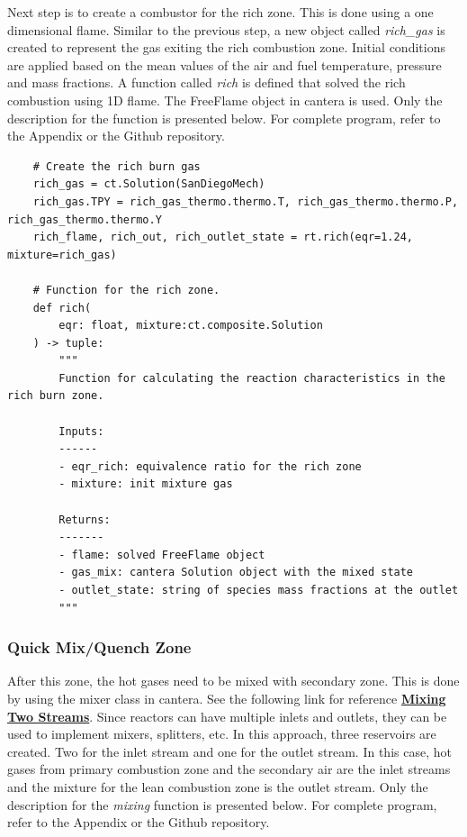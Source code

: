 Next step is to create a combustor for the rich zone. This is done using a one dimensional flame. Similar to the previous step, a new object called \textit{rich\_gas} is created to represent the gas exiting the rich combustion zone. Initial conditions are applied based on the mean values of the air and fuel temperature, pressure and mass fractions. A function called \textit{rich} is defined that solved the rich combustion using 1D flame. The FreeFlame object in cantera is used. Only the description for the function is presented below. For complete program, refer to the Appendix or the Github repository.

\begin{verbatim}
    # Create the rich burn gas
    rich_gas = ct.Solution(SanDiegoMech)    
    rich_gas.TPY = rich_gas_thermo.thermo.T, rich_gas_thermo.thermo.P, rich_gas_thermo.thermo.Y
    rich_flame, rich_out, rich_outlet_state = rt.rich(eqr=1.24, mixture=rich_gas)

    # Function for the rich zone.
    def rich(
        eqr: float, mixture:ct.composite.Solution
    ) -> tuple:
        """
        Function for calculating the reaction characteristics in the rich burn zone.
       
        Inputs:
        ------
        - eqr_rich: equivalence ratio for the rich zone
        - mixture: init mixture gas
       
        Returns:
        -------
        - flame: solved FreeFlame object
        - gas_mix: cantera Solution object with the mixed state
        - outlet_state: string of species mass fractions at the outlet
        """
\end{verbatim}

\subsubsection{Quick Mix/Quench Zone}


 
After this zone, the hot gases need to be mixed with secondary zone. This is done by using the mixer class in cantera. See the following link for reference \href{https://cantera.org/dev/examples/python/reactors/mix1.html#sphx-glr-examples-python-reactors-mix1-py}{\textbf{Mixing Two Streams}}. Since reactors can have multiple inlets and outlets, they can be used to implement mixers, splitters, etc. In this approach, three reservoirs are created. Two for the inlet stream and one for the outlet stream. In this case, hot gases from primary combustion zone and the secondary air are the inlet streams and the mixture for the lean combustion zone is the outlet stream. Only the description for the \textit{mixing} function is presented below. For complete program, refer to the Appendix or the Github repository.


